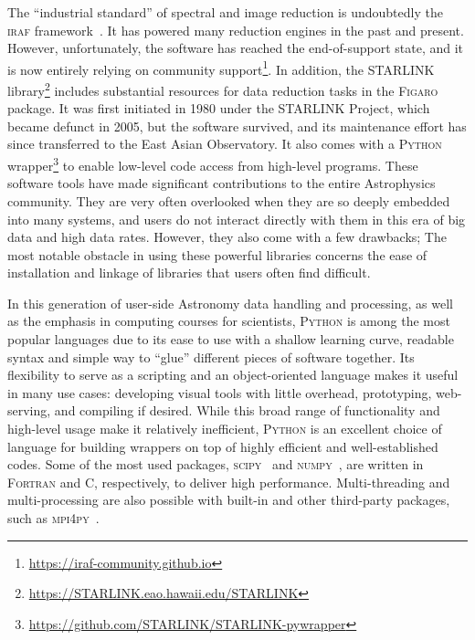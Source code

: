 \documentclass[linenumbers, twocolumn]{aastex631}
\begin{document}
The ``industrial standard'' of spectral and image reduction is undoubtedly
the \textsc{iraf} framework~\citep{1986SPIE..627..733T, 1993ASPC...52..173T}.
It has powered many reduction engines in the past and present. However,
unfortunately, the software has reached the end-of-support state, and it is now
entirely relying on community support\footnote{\url{https://iraf-community.github.io}}.
In addition, the \textsc{STARLINK}
library\footnote{\url{https://STARLINK.eao.hawaii.edu/STARLINK}} \citep{2014ASPC..485..391C, 2022ASPC..532..559B}
includes substantial resources for data reduction tasks in the \textsc{Figaro} package. It was first initiated
in 1980 under the STARLINK Project, which became defunct in 2005, but the
software survived, and its maintenance effort has since transferred to the
East Asian Observatory. It also comes with a \textsc{Python}
wrapper\footnote{\url{https://github.com/STARLINK/STARLINK-pywrapper}}
to enable low-level code access from high-level programs. These software tools
have made significant contributions to the entire Astrophysics community. They
are very often overlooked when they are so deeply embedded into many systems,
and users do not interact directly with them in this era of big data
and high data rates. However, they also come with a few drawbacks; The most
notable obstacle in using these powerful libraries concerns the ease of
installation and linkage of libraries that users often find difficult.

In this generation of user-side Astronomy data handling and processing, as
well as the emphasis in computing courses for scientists, \textsc{Python} is
among the most popular languages due to its ease to use with a shallow learning
curve, readable syntax and simple way to ``glue'' different pieces of software
together. Its flexibility to serve as a scripting and an object-oriented
language makes it useful in many use cases: developing visual tools
with little overhead, prototyping, web-serving, and compiling if
desired. While this broad range of functionality and high-level usage make it
relatively inefficient, \textsc{Python} is an excellent choice of
language for building wrappers on top of highly efficient and well-established codes.
Some of the most used packages, \textsc{scipy}~\citep{2020SciPy-NMeth}
and \textsc{numpy}~\citep{2020NumPy-Array}, are written in \textsc{Fortran}
and \textsc{C}, respectively, to deliver high performance. Multi-threading
and multi-processing are also possible with built-in and other third-party
packages, such as \textsc{mpi4py}~\citep{DALCIN20111124}. 
\end{document}
